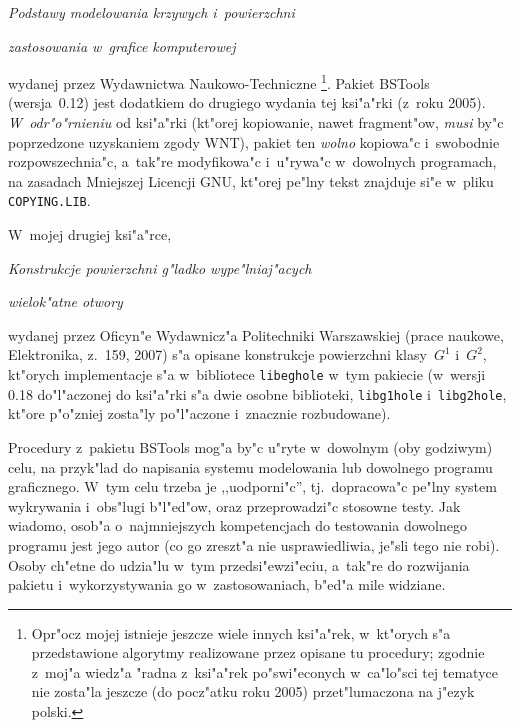 \vspace{\medskipamount}
\centerline{\large\emph{Podstawy modelowania krzywych i~powierzchni}}
\vspace{\smallskipamount}
\centerline{\large\emph{zastosowania w~grafice komputerowej}}

\vspace{\medskipamount}
\noindent
wydanej przez Wydawnictwa Naukowo-Techniczne%
\footnote{%
Opr"ocz mojej istnieje jeszcze wiele innych ksi"a"rek, w~kt"orych s"a
przedstawione algorytmy realizowane przez opisane tu procedury;
zgodnie z~moj"a wiedz"a "radna z~ksi"a"rek po"swi"econych w~ca"lo"sci tej
tematyce nie zosta"la jeszcze (do pocz"atku roku 2005) przet"lumaczona
na j"ezyk polski.}.
Pakiet BSTools (wersja~0{.}12)
jest dodatkiem do drugiego wydania tej ksi"a"rki (z~roku 2005).
\emph{W~odr"o"rnieniu} od ksi"a"rki (kt"orej kopiowanie, nawet
fragment"ow, \emph{musi} by"c poprzedzone uzys\-ka\-niem zgody WNT),
pakiet ten \emph{wolno} kopiowa"c i~swobodnie rozpowszechnia"c,
a~tak"re modyfikowa"c i~u"rywa"c w~dowolnych programach, na zasadach
Mniejszej Licencji GNU, kt"orej pe"lny tekst znajduje si"e w~pliku
\texttt{COPYING.LIB}.

W~mojej drugiej ksi"a"rce,

\vspace{\medskipamount}
\centerline{\large\emph{Konstrukcje powierzchni g"ladko wype"lniaj"acych}}
\vspace{\smallskipamount}
\centerline{\large\emph{wielok"atne otwory}}

\vspace{\medskipamount}
\noindent
wydanej przez Oficyn"e Wydawnicz"a Politechniki Warszawskiej (prace naukowe,
Elektronika, z.~159, 2007) s"a opisane konstrukcje powierzchni klasy~$G^1$
i~$G^2$, kt"orych implementacje s"a w~bibliotece \texttt{libeghole}
w~tym pakiecie (w~wersji 0.18 do"l"aczonej do ksi"a"rki s"a dwie osobne
biblioteki, \texttt{libg1hole} i~\texttt{libg2hole}, kt"ore p"o"zniej zosta"ly
po"l"aczone i~znacznie rozbudowane).

\vspace{\medskipamount}
Procedury z~pakietu BSTools mog"a by"c u"ryte w~dowolnym (oby godziwym)
celu, na przyk"lad do napisania systemu modelowania lub dowolnego programu
graficznego. W~tym celu trzeba je ,,uodporni"c'', tj.\ dopracowa"c pe"lny
system wykrywania i~obs"lugi b"l"ed"ow, oraz przeprowadzi"c stosowne testy.
Jak wiadomo, osob"a o~najmniejszych kompetencjach do testowania dowolnego
programu jest jego autor (co go zreszt"a nie usprawiedliwia, je"sli
tego nie robi). Osoby ch"etne do udzia"lu w~tym przedsi"ewzi"eciu, a~tak"re
do rozwijania pakietu i~wykorzystywania go w~zastosowaniach, b"ed"a
mile widziane.


